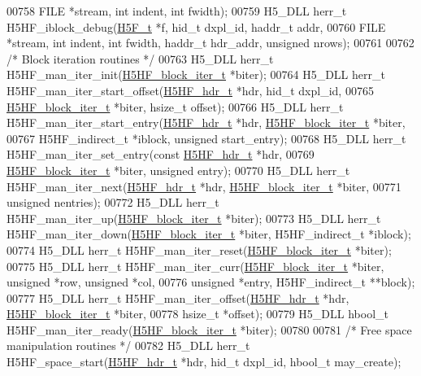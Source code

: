 \begin{DoxyCode}
00758     FILE *stream, \textcolor{keywordtype}{int} indent, \textcolor{keywordtype}{int} fwidth);
00759 H5\_DLL herr\_t H5HF\_iblock\_debug(\hyperlink{struct_h5_f__t}{H5F\_t} *f, hid\_t dxpl\_id, haddr\_t addr,
00760     FILE *stream, \textcolor{keywordtype}{int} indent, \textcolor{keywordtype}{int} fwidth, haddr\_t hdr\_addr, \textcolor{keywordtype}{unsigned} nrows);
00761 
00762 \textcolor{comment}{/* Block iteration routines */}
00763 H5\_DLL herr\_t H5HF\_man\_iter\_init(\hyperlink{struct_h5_h_f__block__iter__t}{H5HF\_block\_iter\_t} *biter);
00764 H5\_DLL herr\_t H5HF\_man\_iter\_start\_offset(\hyperlink{struct_h5_h_f__hdr__t}{H5HF\_hdr\_t} *hdr, hid\_t dxpl\_id,
00765     \hyperlink{struct_h5_h_f__block__iter__t}{H5HF\_block\_iter\_t} *biter, hsize\_t offset);
00766 H5\_DLL herr\_t H5HF\_man\_iter\_start\_entry(\hyperlink{struct_h5_h_f__hdr__t}{H5HF\_hdr\_t} *hdr, 
      \hyperlink{struct_h5_h_f__block__iter__t}{H5HF\_block\_iter\_t} *biter,
00767     H5HF\_indirect\_t *iblock, \textcolor{keywordtype}{unsigned} start\_entry);
00768 H5\_DLL herr\_t H5HF\_man\_iter\_set\_entry(\textcolor{keyword}{const} \hyperlink{struct_h5_h_f__hdr__t}{H5HF\_hdr\_t} *hdr,
00769     \hyperlink{struct_h5_h_f__block__iter__t}{H5HF\_block\_iter\_t} *biter, \textcolor{keywordtype}{unsigned} entry);
00770 H5\_DLL herr\_t H5HF\_man\_iter\_next(\hyperlink{struct_h5_h_f__hdr__t}{H5HF\_hdr\_t} *hdr, \hyperlink{struct_h5_h_f__block__iter__t}{H5HF\_block\_iter\_t} *biter,
00771     \textcolor{keywordtype}{unsigned} nentries);
00772 H5\_DLL herr\_t H5HF\_man\_iter\_up(\hyperlink{struct_h5_h_f__block__iter__t}{H5HF\_block\_iter\_t} *biter);
00773 H5\_DLL herr\_t H5HF\_man\_iter\_down(\hyperlink{struct_h5_h_f__block__iter__t}{H5HF\_block\_iter\_t} *biter, H5HF\_indirect\_t *iblock);
00774 H5\_DLL herr\_t H5HF\_man\_iter\_reset(\hyperlink{struct_h5_h_f__block__iter__t}{H5HF\_block\_iter\_t} *biter);
00775 H5\_DLL herr\_t H5HF\_man\_iter\_curr(\hyperlink{struct_h5_h_f__block__iter__t}{H5HF\_block\_iter\_t} *biter, \textcolor{keywordtype}{unsigned} *row, \textcolor{keywordtype}{unsigned} *col,
00776     \textcolor{keywordtype}{unsigned} *entry, H5HF\_indirect\_t **block);
00777 H5\_DLL herr\_t H5HF\_man\_iter\_offset(\hyperlink{struct_h5_h_f__hdr__t}{H5HF\_hdr\_t} *hdr, \hyperlink{struct_h5_h_f__block__iter__t}{H5HF\_block\_iter\_t} *biter,
00778     hsize\_t *offset);
00779 H5\_DLL hbool\_t H5HF\_man\_iter\_ready(\hyperlink{struct_h5_h_f__block__iter__t}{H5HF\_block\_iter\_t} *biter);
00780 
00781 \textcolor{comment}{/* Free space manipulation routines */}
00782 H5\_DLL herr\_t H5HF\_space\_start(\hyperlink{struct_h5_h_f__hdr__t}{H5HF\_hdr\_t} *hdr, hid\_t dxpl\_id, hbool\_t may\_create);

\end{DoxyCode}
